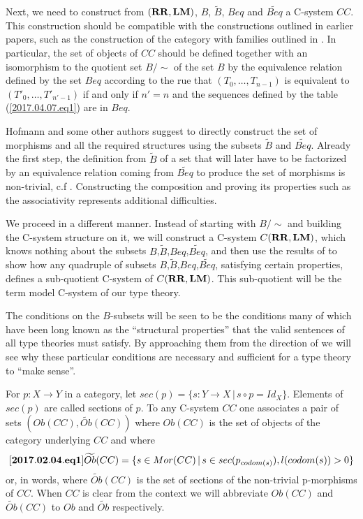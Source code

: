 \documentclass[12pt]{amsart}
\newenvironment{eq}{\begin{equation}}{\end{equation}}
\newcommand{\llabel}[1]{\label{#1}[{\bf #1}]}
\newcommand{\sr}{\rightarrow}
\newcommand{\wt}{\widetilde}
\newcommand{\RR}{{\bf RR}}
\newcommand{\LM}{{\bf LM}}
\begin{document}
Next, we need to construct from $(\RR,\LM)$, $B$, $\wt{B}$, $Beq$ and $\wt{Beq}$ a C-system $CC$. This construction should be compatible with the constructions outlined in earlier papers, such as the construction of the category with families outlined in \cite{Hofmann}. In particular, the set of objects of $CC$ should be defined together with an isomorphism to the quotient set $B/\sim$ of the set $B$ by the equivalence relation defined by the set $Beq$ according to the rue  that $(T_0,\dots,T_{n-1})$ is equivalent to $(T'_0,\dots,T'_{n'-1})$ if and only if $n'=n$ and the sequences defined by the table (\ref{2017.04.07.eq1}) are in $Beq$. 

Hofmann and some other authors suggest to directly construct the set of morphisms and all the required structures using the subsets $\wt{B}$ and $\wt{Beq}$. Already the first step, the definition from $\wt{B}$ of a set that will later have to be factorized by an equivalence relation coming from $\wt{Beq}$ to produce the set of morphisms is non-trivial, c.f \cite[Def. 2.11, p.97]{Hofmann}. Constructing the composition and proving its properties such as the associativity represents additional difficulties.

We proceed in a different manner. Instead of starting with $B/\sim$ and building the C-system structure on it, we will construct a C-system $C(\RR,\LM)$, which knows nothing about the subsets $B$,$\wt{B}$,$Beq$,$\wt{Beq}$, and then use the results of \cite{Csubsystems} to show how any quadruple of subsets $B$,$\wt{B}$,$Beq$,$\wt{Beq}$, satisfying certain properties, defines a sub-quotient C-system of $C(\RR,\LM)$. This sub-quotient will be the term model C-system of our type theory. 

The conditions on the $B$-subsets will be seen to be the conditions many of which have been long known as the ``structural properties'' that the valid sentences of all type theories must satisfy. By approaching them from the direction of \cite{Csubsystems} we will see why these particular conditions are necessary and sufficient for a type theory to ``make sense''. 





For $p:X\sr Y$ in a category, let $sec(p)=\{s:Y\sr X\,|\,s\circ p=Id_X\}$. Elements of $sec(p)$ are called sections of $p$. To any C-system $CC$ one associates a pair of sets $(Ob(CC),\wt{Ob}(CC))$ where $Ob(CC)$ is the set of objects of the category underlying $CC$ and where 
%
\begin{eq}
\llabel{2017.02.04.eq1}
\wt{Ob}(CC)=\{s\in Mor(CC)\,|\,s\in sec(p_{codom(s)}), l(codom(s))>0\}
\end{eq}
%
or, in words, where $\wt{Ob}(CC)$ is the set of sections of the non-trivial p-morphisms of $CC$. When $CC$ is clear from the context we will abbreviate $Ob(CC)$ and $\wt{Ob}(CC)$ to $Ob$ and $\wt{Ob}$ respectively. 
\end{document}
